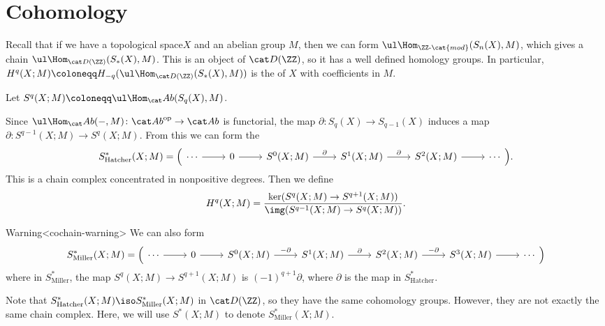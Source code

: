 \documentclass{standalone}
\begin{document}
\section{Cohomology}
Recall that if we have a topological space\(X\)
and an abelian group \(M\), then we can form
\(\ul\Hom_{\ZZ\text{-}\cat{mod}}(S_n(X), M)\), %
which gives a chain \(\ul\Hom_{\der(\ZZ)}(S_*(X), M)\).
This is an object of \(\der(\ZZ)\),
so it has a well defined homology groups.
In particular, \(H^q(X; M) \coloneqq H_{-q}(\ul\Hom_{\der(\ZZ)}(S_*(X), M))\)
is the  of \(X\) with coefficients in \(M\).

\begin{definition}
  Let \(S^q(X; M) \coloneqq \ul\Hom_\cAb(S_q(X), M)\).
\end{definition}
Since \(\ul\Hom_\cAb({-}, M) \colon \cAb^\op \to \cAb\) is functorial,
the map \(\partial \colon S_q(X) \to S_{q-1}(X)\) induces a map
\(\partial \colon S^{q-1}(X; M) \to S^q(X; M)\).
From this we can form the 
\[
  S^*_{\text{Hatcher}}(X; M) = \Big(\begin{tikzcd}
    \cdots \ar[r] &
      0 \ar[r] &
      S^0(X; M) \ar[r, "\partial"] &
      S^1(X; M) \ar[r, "\partial"] &
      S^2(X; M) \ar[r] &
      \cdots
  \end{tikzcd}
  \Big).
\]
This is a chain complex concentrated in nonpositive degrees.
Then we define
\[
  H^q(X; M) = \frac{\ker (S^q(X; M) \to S^{q+1}(X; M))}
                   {\img (S^{q-1}(X; M) \to S^q(X; M))}.
\]

\begin{adhoctheorem}{Warning}<cochain-warning>
  We can also form
  \[
    S^*_{\text{Miller}}(X; M) = \Big(\begin{tikzcd}
      \cdots \ar[r] &
        0 \ar[r] &
        S^0(X; M) \ar[r, "-\partial"] &
        S^1(X; M) \ar[r, "\partial"] &
        S^2(X; M) \ar[r, "-\partial"] &
        S^3(X; M) \ar[r] &
        \cdots
    \end{tikzcd}
    \Big)
  \]
  where in \(S^*_{\text{Miller}}\),
  the map \(S^q(X; M) \to S^{q+1}(X; M)\) is \((-1)^{q+1} \partial\),
  where \(\partial\) is the map in \(S^*_{\text{Hatcher}}\).
\end{adhoctheorem}

Note that \(S^*_{\text{Hatcher}}(X; M) \iso S^*_{\text{Miller}}(X; M)\)
in \(\der(\ZZ)\), so they have the same cohomology groups.
However, they are not exactly the same chain complex.
Here, we will use \(S^*(X; M)\) to denote \(S^*_{\text{Miller}}(X; M)\).
\end{document}
